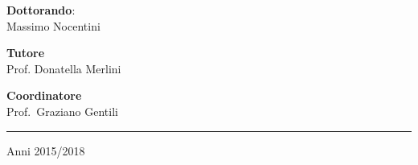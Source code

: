 \normalsize
\hspace{1cm}\begin{minipage}{0.42\linewidth}
\textbf{Dottorando}:
\\
{Massimo Nocentini}
\end{minipage}
\hspace{2cm}
\begin{minipage}{0.42\linewidth}
\textbf{Tutore}
\\
{Prof. Donatella Merlini}

\end{minipage}
\par \vspace{10mm}

\begin{center}
\begin{minipage}{0.30\linewidth}
\textbf{Coordinatore}
\\
{Prof.~Graziano Gentili}
\end{minipage}
\end{center}
\par \vspace{9mm}
\begin{center}
\hrule
\par \vspace{5mm}
Anni 2015/2018

\end{center}
\restoregeometry
